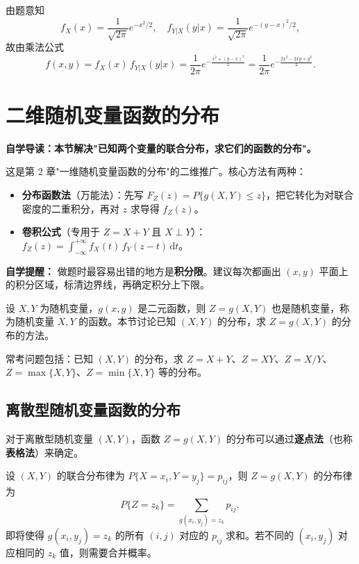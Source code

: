 ﻿\documentclass[lang=cn,11pt]{elegantbook}
\begin{document}
\begin{solution}
由题意知
\[
f_X(x) = \frac{1}{\sqrt{2\pi}}e^{-x^2/2}, \quad f_{Y|X}(y|x) = \frac{1}{\sqrt{2\pi}}e^{-(y-x)^2/2},
\]
故由乘法公式
\[
f(x,y) = f_X(x)\,f_{Y|X}(y|x) = \frac{1}{2\pi}e^{-\frac{x^2 + (y-x)^2}{2}} = \frac{1}{2\pi}e^{-\frac{2x^2 - 2xy + y^2}{2}}.
\]
\end{solution}


\section{二维随机变量函数的分布}

\begin{note}
\textbf{自学导读：本节解决"已知两个变量的联合分布，求它们的函数的分布"。}

这是第 2 章"一维随机变量函数的分布"的二维推广。核心方法有两种：
\begin{itemize}
    \item \textbf{分布函数法}（万能法）：先写 $F_Z(z)=P\{g(X,Y)\leqslant z\}$，把它转化为对联合密度的二重积分，再对 $z$ 求导得 $f_Z(z)$。
    \item \textbf{卷积公式}（专用于 $Z=X+Y$ 且 $X\perp Y$）：$f_Z(z)=\int_{-\infty}^{+\infty}f_X(t)\,f_Y(z-t)\,\mathrm{d}t$。
\end{itemize}

\textbf{自学提醒：} 做题时最容易出错的地方是\textbf{积分限}。建议每次都画出 $(x,y)$ 平面上的积分区域，标清边界线，再确定积分上下限。
\end{note}

设 $X, Y$ 为随机变量，$g(x,y)$ 是二元函数，则 $Z = g(X,Y)$ 也是随机变量，称为随机变量 $X, Y$ 的函数。本节讨论已知 $(X,Y)$ 的分布，求 $Z = g(X,Y)$ 的分布的方法。

常考问题包括：已知 $(X,Y)$ 的分布，求 $Z = X + Y$、$Z = XY$、$Z = X/Y$、$Z = \max\{X,Y\}$、$Z = \min\{X,Y\}$ 等的分布。

\subsection{离散型随机变量函数的分布}

对于离散型随机变量 $(X,Y)$，函数 $Z = g(X,Y)$ 的分布可以通过\textbf{逐点法}（也称\textbf{表格法}）来确定。

\begin{property}[逐点法]\label{prop:pointwise-method} 
设 $(X,Y)$ 的联合分布律为 $P\{X = x_i, Y = y_j\} = p_{ij}$，则 $Z = g(X,Y)$ 的分布律为
\[
P\{Z = z_k\} = \sum_{g(x_i,y_j) = z_k}p_{ij},
\]
即将使得 $g(x_i, y_j) = z_k$ 的所有 $(i,j)$ 对应的 $p_{ij}$ 求和。若不同的 $(x_i, y_j)$ 对应相同的 $z_k$ 值，则需要合并概率。
\end{property}
\end{document}
